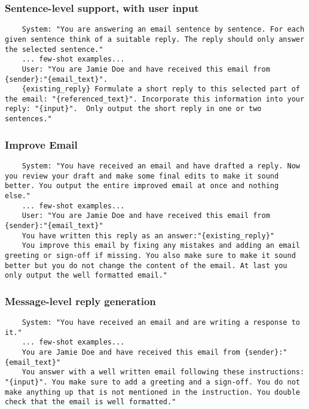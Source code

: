 \subsubsection{Sentence-level support, with user input} %
\begin{lstlisting}
    System: "You are answering an email sentence by sentence. For each given sentence think of a suitable reply. The reply should only answer the selected sentence."
    ... few-shot examples...
    User: "You are Jamie Doe and have received this email from {sender}:"{email_text}".
    {existing_reply} Formulate a short reply to this selected part of the email: "{referenced_text}". Incorporate this information into your reply: "{input}".  Only output the short reply in one or two sentences."
\end{lstlisting}

\subsubsection{Improve Email}\label{subsec:appendix_improve_email_prompt} %
\begin{lstlisting}
    System: "You have received an email and have drafted a reply. Now you review your draft and make some final edits to make it sound better. You output the entire improved email at once and nothing else."
    ... few-shot examples...
    User: "You are Jamie Doe and have received this email from {sender}:"{email_text}"
    You have written this reply as an answer:"{existing_reply}"
    You improve this email by fixing any mistakes and adding an email greeting or sign-off if missing. You also make sure to make it sound better but you do not change the content of the email. At last you only output the well formatted email."
\end{lstlisting}

\subsubsection{Message-level reply generation} \mbox{}
\begin{lstlisting}
    System: "You have received an email and are writing a response to it."
    ... few-shot examples...
    You are Jamie Doe and have received this email from {sender}:"{email_text}"
    You answer with a well written email following these instructions: "{input}". You make sure to add a greeting and a sign-off. You do not make anything up that is not mentioned in the instruction. You double check that the email is well formatted."
\end{lstlisting}







